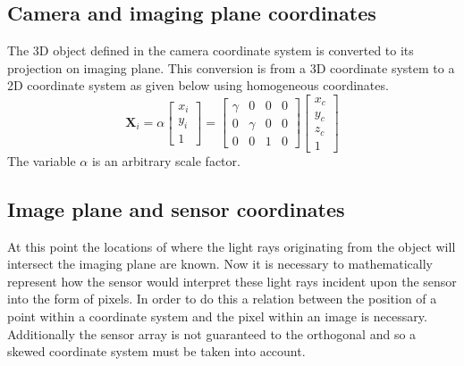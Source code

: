 \subsection{Camera and imaging plane coordinates}
The 3D object defined in the camera coordinate system is converted to its projection on imaging plane. This conversion is from a 3D coordinate system to a 2D coordinate system as given below using homogeneous coordinates.
\begin{equation}
\label{eq:c2i}
	\bm{X}_i = \alpha
	\begin{bmatrix}
	x_i \\
	y_i \\
	1
	\end{bmatrix} 
	= 
	\begin{bmatrix}
	\gamma & 0 & 0 & 0 \\
	0 & \gamma & 0 & 0 \\
	0 & 0 & 1 & 0
	\end{bmatrix}
	\begin{bmatrix}
	x_c \\
	y_c \\
	z_c \\
	1
	\end{bmatrix}
\end{equation}
The variable $\alpha$ is an arbitrary scale factor.

\subsection{Image plane and sensor coordinates}
At this point the locations of where the light rays originating from the object will intersect the imaging plane are known. Now it is necessary to mathematically represent how the sensor would interpret these light rays incident upon the sensor into the form of pixels. In order to do this a relation between the position of a point within a coordinate system and the pixel within an image is necessary. Additionally the sensor array is not guaranteed to the orthogonal and so a skewed coordinate system must be taken into account.

